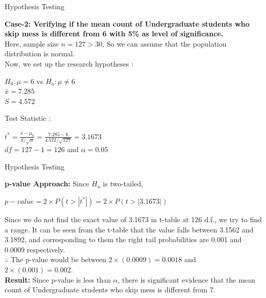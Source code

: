 \documentclass{beamer}
\begin{document}
\begin{frame}{Hypothesis Testing}
\begin{block}{}
\textbf{Case-2: Verifying if the mean count of Undergraduate students who skip mess is different from 6 with 5\% as level of significance.}\\
Here, sample size $n = 127 > 30$, So we can assume that the population distribution is normal.\\
Now, we set up the research hypotheses :
\begin{center}
$H_0 : \mu = 6$ \quad vs \quad $H_a : \mu \neq 6$\\
$\bar{x} = 7.285$\\
$S = 4.572$
\end{center}
Test Statistic :
\begin{center}
$t^* = \frac{\bar{x}-\mu_0}{S/\sqrt{n}} = \frac{7.285-6}{4.572/\sqrt{127}} = 3.1673$\\
$df = 127 - 1 = 126$ and $\alpha = 0.05$
\end{center}
\end{block}
\end{frame}

\begin{frame}{Hypothesis Testing}
\begin{block}{}
\textbf{p-value Approach:}
Since $H_a$ is two-tailed,
\begin{center}
$p-value = 2\times P(t>|t^*|) = 2\times P(t>|3.1673|)$ 
\end{center}
Since we do not find the exact value of 3.1673 in t-table at 126 d.f., we try to find a range. It can be seen from the t-table that the value falls between 3.1562 and 3.1892, and corresponding to them the right tail probabilities are 0.001 and 0.0009 respectively.\\
$\therefore$ The p-value would be between $2\times(0.0009) = 0.0018$ and $2\times(0.001) = 0.002$.\\
\textbf{Result:}
Since p-value is less than $\alpha$, there is significant evidence that the mean count of Undergraduate students who skip mess is different from 7.
\end{block}
\end{frame}
\end{document}
